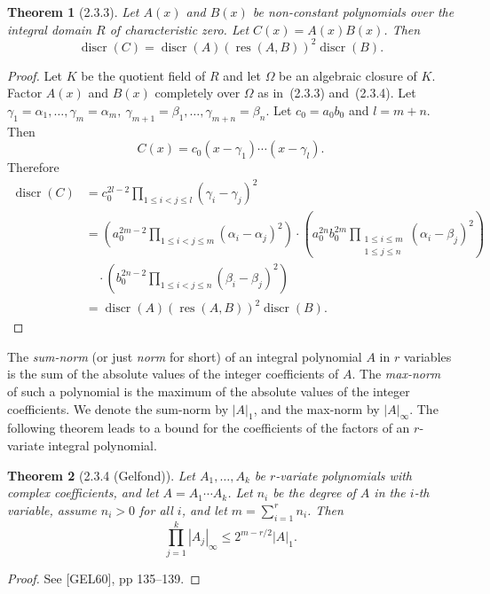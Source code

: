 \documentclass[11pt]{article}
\theoremstyle{plain}
\newtheorem*{theorem*}{Theorem}
\theoremstyle{definition}
\DeclareMathOperator{\res}{res}
\DeclareMathOperator{\discr}{discr}
\begin{document}
\begin{theorem*}[2.3.3]
Let $A(x)$ and $B(x)$ be non-constant polynomials over the integral
domain $R$ of characteristic zero. Let $C(x) = A(x) B(x)$. Then
\[
\discr(C) = \discr(A) (\res(A, B))^2 \discr(B).
\]
\end{theorem*}

\begin{proof}
Let $K$ be the quotient field of $R$ and let $\Omega$ be an algebraic
closure of $K$. Factor $A(x)$ and $B(x)$ completely over $\Omega$ as
in~(2.3.3) and~(2.3.4). Let
$\gamma_1 = \alpha_1, \ldots, \gamma_m = \alpha_m,\
\gamma_{m+1} = \beta_1, \ldots, \gamma_{m+n} = \beta_n$. Let
$c_0 = a_0 b_0$ and $l = m + n$. Then
\[
C(x) = c_0 (x - \gamma_1) \cdots (x - \gamma_l).
\]
Therefore
\[
\begin{aligned}
\discr(C) &= c_0^{2l - 2} \prod_{1 \le i < j \le l} (\gamma_i - \gamma_j)^2 \\
&= \left( a_0^{2m-2} \prod_{1 \le i < j \le m} (\alpha_i - \alpha_j)^2 \right)
\cdot
\left( a_0^{2n} b_0^{2m}
\prod_{\substack{1 \le i \le m \\ 1 \le j \le n}} (\alpha_i - \beta_j)^2 \right) \\
&\quad \cdot \left( b_0^{2n-2} \prod_{1 \le i < j \le n} (\beta_i - \beta_j)^2 \right) \\
&= \discr(A) (\res(A, B))^2 \discr(B).
\end{aligned}
\]
\end{proof}

The \emph{sum-norm} (or just \emph{norm} for short) of an integral
polynomial $A$ in $r$ variables is the sum of the absolute values of the
integer coefficients of $A$. The \emph{max-norm} of such a polynomial is
the maximum of the absolute values of the integer coefficients. We
denote the sum-norm by $|A|_1$, and the max-norm by $|A|_\infty$. The
following theorem leads to a bound for the coefficients of the factors
of an $r$-variate integral polynomial.

\begin{theorem*}[2.3.4 (Gelfond)]
Let $A_1, \ldots, A_k$ be $r$-variate polynomials with complex
coefficients, and let $A = A_1 \cdots A_k$. Let $n_i$ be the degree of
$A$ in the $i$-th variable, assume $n_i > 0$ for all $i$, and let
$m = \sum_{i=1}^{r} n_i$. Then
\[
\prod_{j=1}^{k} |A_j|_\infty \le 2^{m-r/2} |A|_1.
\]
\end{theorem*}

\begin{proof}
See [GEL60], pp 135--139.
\end{proof}
\end{document}
